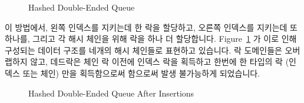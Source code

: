 \begin{figure}[tb]
\centering
{}
\caption{Hashed Double-Ended Queue}
\label{fig:SMPdesign:Hashed Double-Ended Queue}
\end{figure}

이 방법에서, 왼쪽 인덱스를 지키는데 한 락을 할당하고, 오른쪽 인덱스를 지키는데
또하나를, 그리고 각 해시 체인을 위해 락을 하나 더 할당합니다.
Figure~\ref{fig:SMPdesign:Hashed Double-Ended Queue} 가 이로 인해 구성되는
데이터 구조를 네개의 해시 체인들로 표현하고 있습니다.
락 도메인들은 오버랩하지 않고, 데드락은 체인 락 이전에 인덱스 락을 획득하고
한번에 한 타입의 락 (인덱스 또는 체인) 만을 획득함으로써 함으로써 발생
불가능하게 되었습니다.

\begin{figure}[tb]
\centering
{}
\caption{Hashed Double-Ended Queue After Insertions}
\label{fig:SMPdesign:Hashed Double-Ended Queue After Insertions}
\end{figure}

